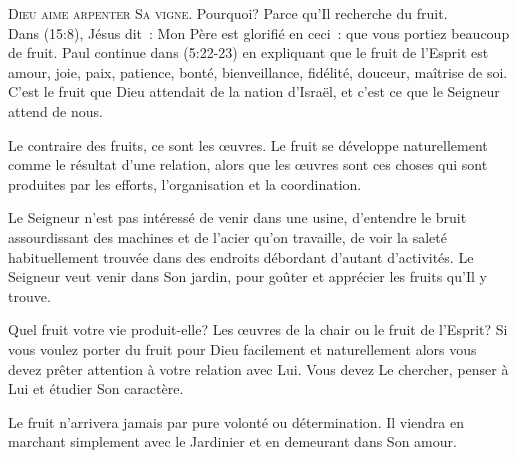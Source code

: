 





\lettrine{D}{ieu aime arpenter Sa vigne.}
 Pourquoi? Parce qu'Il recherche du fruit. \\[1ex]
Dans (15:8), Jésus dit~: 
 \og Mon Père est glorifié en ceci~: que vous portiez beaucoup de fruit. \fg{}
 Paul continue dans (5:22-23) en expliquant que le fruit
 de l'Esprit est \og amour, joie, paix, patience, bonté, bienveillance,
 fidélité, douceur, maîtrise de soi. \fg{}
 C'est le fruit que Dieu attendait de la nation d'Israël,
 et c'est ce que le Seigneur attend de nous.


Le contraire des fruits, ce sont les œuvres.
 Le fruit se développe naturellement comme le résultat d'une relation,
 alors que les œuvres sont ces choses qui sont produites par les efforts,
 l'organisation et la coordination.

Le Seigneur n'est pas intéressé de venir dans une usine,
 d'entendre le bruit assourdissant des machines et de l'acier qu'on travaille,
 de voir la saleté habituellement trouvée dans des endroits
 débordant d'autant  d'activités.
 Le Seigneur veut venir dans Son jardin, pour goûter et apprécier
 les fruits qu'Il y trouve.

Quel fruit votre vie produit-elle? Les œuvres de la chair
 ou le fruit de l'Esprit? Si vous voulez porter du fruit pour Dieu
 \ocadr facilement et naturellement \fcadr{} alors vous devez prêter
 attention à votre relation avec Lui. Vous devez Le chercher,
 penser à Lui et étudier Son caractère.

Le fruit n'arrivera jamais par pure volonté ou détermination.
 Il viendra en marchant simplement avec le Jardinier
 et en demeurant dans Son amour.

\dvrule

